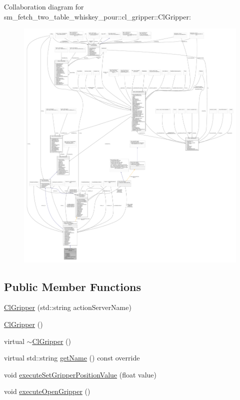 Collaboration diagram for sm\+\_\+fetch\+\_\+two\+\_\+table\+\_\+whiskey\+\_\+pour\+:\+:cl\+\_\+gripper\+:\+:Cl\+Gripper\+:
\nopagebreak
\begin{figure}[H]
\begin{center}
\leavevmode
\includegraphics[width=350pt]{classsm__fetch__two__table__whiskey__pour_1_1cl__gripper_1_1ClGripper__coll__graph}
\end{center}
\end{figure}
\subsection*{Public Member Functions}
\begin{DoxyCompactItemize}
\item 
\hyperlink{classsm__fetch__two__table__whiskey__pour_1_1cl__gripper_1_1ClGripper_a80d2fe48106968871fe657a15db294f3}{Cl\+Gripper} (std\+::string action\+Server\+Name)
\item 
\hyperlink{classsm__fetch__two__table__whiskey__pour_1_1cl__gripper_1_1ClGripper_ad225123f29e828d7a2d017a3bfc4d18c}{Cl\+Gripper} ()
\item 
virtual \hyperlink{classsm__fetch__two__table__whiskey__pour_1_1cl__gripper_1_1ClGripper_ab46766167ae2d366f7f83d5cf34f68f4}{$\sim$\+Cl\+Gripper} ()
\item 
virtual std\+::string \hyperlink{classsm__fetch__two__table__whiskey__pour_1_1cl__gripper_1_1ClGripper_a9790f119467bb9021f50d6a467f49108}{get\+Name} () const override
\item 
void \hyperlink{classsm__fetch__two__table__whiskey__pour_1_1cl__gripper_1_1ClGripper_ae93971dd798e84fa30764d6f0d2f2a97}{execute\+Set\+Gripper\+Position\+Value} (float value)
\item 
void \hyperlink{classsm__fetch__two__table__whiskey__pour_1_1cl__gripper_1_1ClGripper_ad3cee1d6a5fe550ed7f01d2dfc3515db}{execute\+Open\+Gripper} ()
\end{DoxyCompactItemize}
